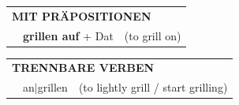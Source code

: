 \documentclass[10pt,a4paper]{revtex4-2}
\begin{document}
\begin{verbbox-acc}
\vspace{10pt}

\begin{tabular}{lll}
\multicolumn{3}{l}{\textbf{MIT PRÄPOSITIONEN}}\\
& \textbf{grillen auf} + Dat & (to grill on)\\
\end{tabular}
\hfill
\begin{tabular}{lll}
\multicolumn{3}{l}{\textbf{TRENNBARE VERBEN}}\\
& an$|$grillen & (to lightly grill / start grilling)\\
\end{tabular}

\vspace{-5pt}
\end{verbbox-acc}
\end{document}
